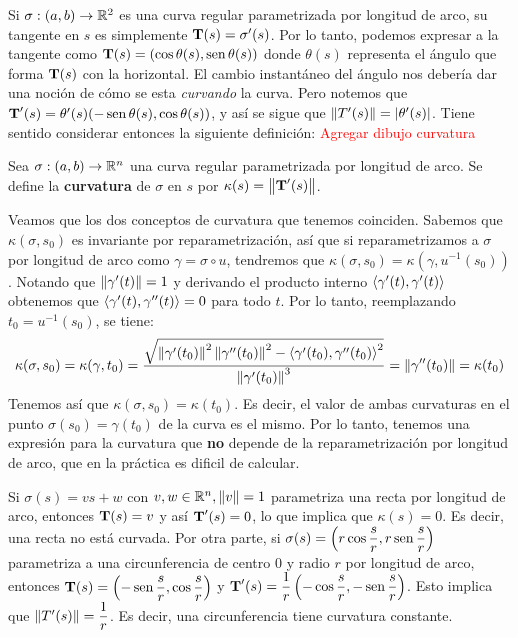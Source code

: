 Si $\sigma:(a,b)\to\mathbb{R}^2$ es una curva regular parametrizada por longitud de arco, su tangente en $s$ es simplemente $\operatorname{\mathbf{T}}(s)=\sigma'(s)$. Por lo tanto, podemos expresar a la tangente como $\operatorname{\mathbf{T}}(s)=(\cos\theta(s),\operatorname{sen}\theta(s))$ donde $\theta(s)$ representa el ángulo que forma $\operatorname{\mathbf{T}}(s)$ con la horizontal. El cambio instantáneo del ángulo nos debería dar una noción de cómo se esta \textit{curvando} la curva. Pero notemos que $\operatorname{\mathbf{T}}'(s)=\theta'(s)(-\operatorname{sen}\theta(s),\cos\theta(s))$, y así se sigue que $\left\| T'(s) \right\|=\left\lvert \theta'(s) \right\rvert$. Tiene sentido considerar entonces la siguiente definición: \textcolor{red}{Agregar dibujo curvatura}

\begin{defn}
Sea $\sigma:(a,b)\to\mathbb{R}^n$ una curva regular parametrizada por longitud de arco. Se define la \textbf{curvatura} de $\sigma$ en $s$ por $\kappa(s)=\left\| \operatorname{\mathbf{T}}'(s) \right\|$.
\end{defn}

\begin{obs}
Veamos que los dos conceptos de curvatura que tenemos coinciden. Sabemos que $\kappa(\sigma,s_0)$ es invariante por reparametrización, así que si reparametrizamos a $\sigma$ por longitud de arco como $\gamma=\sigma\circ u$, tendremos que $\kappa(\sigma,s_0) = \kappa(\gamma,u^{-1}(s_0))$. Notando que $\left\| \gamma'(t) \right\|=1$ y derivando el producto interno $\left\langle \gamma'(t),\gamma'(t) \right\rangle$ obtenemos que $\left\langle \gamma'(t),\gamma''(t) \right\rangle=0$ para todo $t$. Por lo tanto, reemplazando $t_0=u^{-1}(s_0)$, se tiene: $$\kappa(\sigma,s_0)=\kappa(\gamma,t_0)=\dfrac{\sqrt{\left\| \gamma'(t_0) \right\|^2\left\| \gamma''(t_0) \right\|^2 - \left\langle \gamma'(t_0),\gamma''(t_0) \right\rangle^2}}{\left\| \gamma'(t_0) \right\|^3} = \left\| \gamma''(t_0) \right\|=\kappa(t_0)$$ Tenemos así que $\kappa(\sigma,s_0)=\kappa(t_0)$. Es decir, el valor de ambas curvaturas en el punto $\sigma(s_0)=\gamma(t_0)$ de la curva es el mismo. Por lo tanto, tenemos una expresión para la curvatura que \textbf{no} depende de la reparametrización por longitud de arco, que en la práctica es dificil de calcular.
\end{obs}

\begin{ex}
Si $\sigma(s)=vs+w$ con $v,w\in\mathbb{R}^n, \left\| v \right\|=1$ parametriza una recta por longitud de arco, entonces $\operatorname{\mathbf{T}}(s)=v$ y así $\operatorname{\mathbf{T}}'(s)=0$, lo que implica que $\kappa(s)=0$. Es decir, una recta no está curvada. Por otra parte, si $\sigma(s)=\left(r\cos\dfrac{s}{r},r\operatorname{sen}\dfrac{s}{r}\right)$ parametriza a una circunferencia de centro $0$ y radio $r$ por longitud de arco, entonces $\operatorname{\mathbf{T}}(s)=\left(-\operatorname{sen}\dfrac{s}{r},\cos\dfrac{s}{r}\right)$ y $\operatorname{\mathbf{T}}'(s)=\dfrac{1}{r}\left(-\cos\dfrac{s}{r},-\operatorname{sen}\dfrac{s}{r}\right)$. Esto implica que $\left\| T'(s) \right\|=\dfrac{1}{r}$. Es decir, una circunferencia tiene curvatura constante.
\end{ex}

